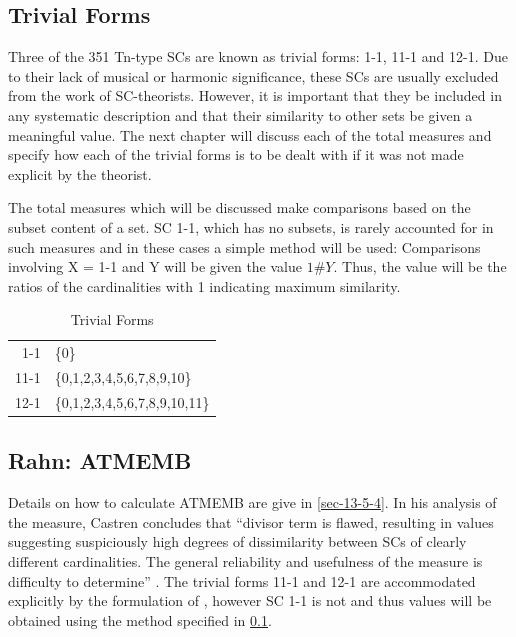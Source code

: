 \documentclass{article}
\begin{document}
\subsection{Trivial Forms}
\label{sec-7-1}

Three of the 351 Tn-type SCs are known as trivial forms: 1-1, 11-1 and
12-1. Due to their lack of musical or harmonic significance, these SCs
are usually excluded from the work of SC-theorists. However, it is
important that they be included in any systematic description and that
their similarity to other sets be given a meaningful value. The next
chapter will discuss each of the total measures and specify how each
of the trivial forms is to be dealt with if it was not made explicit
by the theorist. 

The total measures which will be discussed make comparisons based on
the subset content of a set. SC 1-1, which has no subsets, is rarely
accounted for in such measures and in these cases a simple method will
be used: Comparisons involving X = 1-1 and Y will be given the value
$1\#Y$. Thus, the value will be the ratios of the cardinalities with 1
indicating maximum similarity.
\begin{table}[htb]
\caption{Trivial Forms} 
\begin{center}
\begin{tabular}{rl}
  1-1  &  \{0\}                          \\
 11-1  &  \{0,1,2,3,4,5,6,7,8,9,10\}     \\
 12-1  &  \{0,1,2,3,4,5,6,7,8,9,10,11\}  \\
\end{tabular}
\end{center}
\end{table}
\subsection{Rahn: ATMEMB}
\label{sec-7-2}

Details on how to calculate ATMEMB are give in \ref{sec-13-5-4}. In his analysis
of the measure, Castren concludes that ``divisor term is flawed,
resulting in values suggesting suspiciously high degrees of
dissimilarity between SCs of clearly different cardinalities. The
general reliability and usefulness of the measure is difficulty to
determine'' \citep[pp. 89]{Castren1994}. The trivial forms 11-1 and
12-1 are accommodated explicitly by the formulation of
\citet{Rahn1979}, however SC 1-1 is not and thus values will be
obtained using the method specified in \ref{sec-7-1}.
\end{document}
